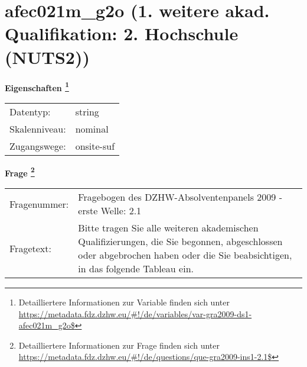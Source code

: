 
    \setcounter{footnote}{0}

    \vspace*{-1.8cm}
	\section{afec021m\_g2o (1. weitere akad. Qualifikation: 2. Hochschule (NUTS2))}
	\label{section:afec021m_g2o}



    \vspace*{0.5cm}
    \noindent\textbf{Eigenschaften
	\footnote{Detailliertere Informationen zur Variable finden sich unter
		\url{https://metadata.fdz.dzhw.eu/\#!/de/variables/var-gra2009-ds1-afec021m_g2o$}}}\\
	\begin{tabularx}{\hsize}{@{}lX}
	Datentyp: & string \\
	Skalenniveau: & nominal \\
	Zugangswege: &
	  onsite-suf
 \\
    \end{tabularx}



				\vspace*{0.5cm}
                \noindent\textbf{Frage
	                \footnote{Detailliertere Informationen zur Frage finden sich unter
		              \url{https://metadata.fdz.dzhw.eu/\#!/de/questions/que-gra2009-ins1-2.1$}}}\\
				\begin{tabularx}{\hsize}{@{}lX}
					Fragenummer: &
					  Fragebogen des DZHW-Absolventenpanels 2009 - erste Welle:
					  2.1
 \\
					Fragetext: & Bitte tragen Sie alle weiteren akademischen Qualifizierungen, die Sie begonnen, abgeschlossen oder abgebrochen haben oder die Sie beabsichtigen, in das folgende Tableau ein. \\
				\end{tabularx}






